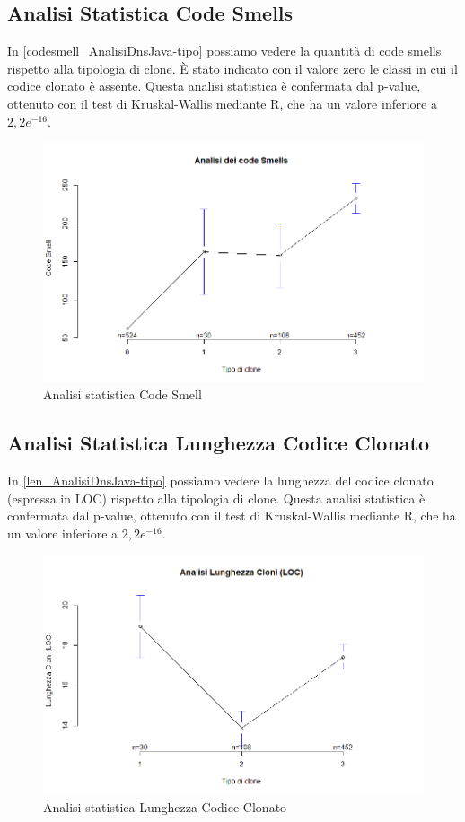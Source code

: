\subsection{Analisi Statistica Code Smells}
In \autoref{codesmell_AnalisiDnsJava-tipo} possiamo vedere la quantità di code smells rispetto alla tipologia di clone. È stato indicato con il valore zero le classi in cui il codice clonato è assente. Questa analisi statistica è confermata dal p-value, ottenuto con il test di Kruskal-Wallis mediante R, che ha un valore inferiore a $2,2 e^{-16}$. \newpage
\begin{figure}[htbp]
	\centering
	\includegraphics[scale=0.5]{analisi_R/AnalisiDnsJava/2-gplot-codesmell-type.png}
\caption{Analisi statistica Code Smell}
\label{codesmell_AnalisiDnsJava-tipo}
\end{figure}

\subsection{Analisi Statistica Lunghezza Codice Clonato}
In \autoref{len_AnalisiDnsJava-tipo} possiamo vedere la lunghezza del codice clonato (espressa in LOC) rispetto alla tipologia di clone. Questa analisi statistica è confermata dal p-value, ottenuto con il test di Kruskal-Wallis mediante R, che ha un valore inferiore a $2,2 e^{-16}$. \newpage
\begin{figure}[htbp]
	\centering
	\includegraphics[scale=0.5]{analisi_R/AnalisiDnsJava/3-gplot-len-type.png}
\caption{Analisi statistica Lunghezza Codice Clonato }
\label{len_AnalisiDnsJava-tipo}
\end{figure}